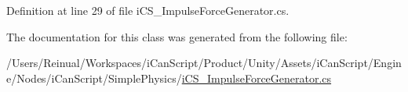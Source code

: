 Definition at line 29 of file i\+C\+S\+\_\+\+Impulse\+Force\+Generator.\+cs.



The documentation for this class was generated from the following file\+:\begin{DoxyCompactItemize}
\item 
/\+Users/\+Reinual/\+Workspaces/i\+Can\+Script/\+Product/\+Unity/\+Assets/i\+Can\+Script/\+Engine/\+Nodes/i\+Can\+Script/\+Simple\+Physics/\hyperlink{i_c_s___impulse_force_generator_8cs}{i\+C\+S\+\_\+\+Impulse\+Force\+Generator.\+cs}\end{DoxyCompactItemize}
